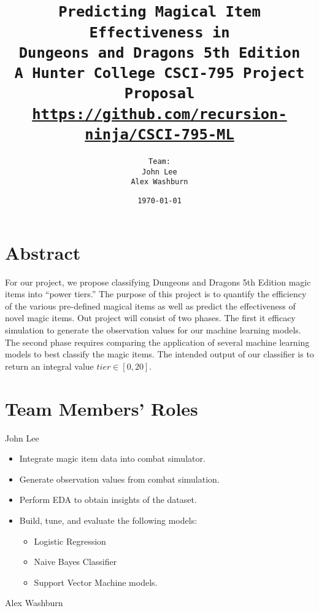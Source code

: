 \documentclass[12pt]{diazessay}
\title{\texttt{\LARGE{Predicting Magical Item Effectiveness in \\Dungeons and Dragons 5th Edition} \\\vspace{-0.35cm} {\large A Hunter College CSCI-795 Project Proposal}\\\normalsize\url{https://github.com/recursion-ninja/CSCI-795-ML}}} %
\author{\texttt{{\Huge Team:}\\\vspace*{-0.5em} 
		John Lee \\\vspace*{-0.5em} 
		Alex Washburn}} %
\date{\texttt{\today}} %
\begin{document}
\maketitle %

\vspace{-1cm}
\section*{Abstract}


For our project, we propose classifying Dungeons and Dragons 5th Edition magic items into ``power tiers.''
The purpose of this project is to quantify the efficiency of the various pre-defined magical items as well as predict the effectiveness of novel magic items.
Out project will consist of two phases. The first it efficacy simulation to generate the observation values for our machine learning models.
The second phase requires comparing the application of several machine learning models to best classify the magic items.
The intended output of our classifier is to return an integral value $tier \in [0, 20]$.

\section*{Team Members' Roles}

John Lee

\begin{itemize}
	
	\item Integrate magic item data into combat simulator.
	\item Generate observation values from combat simulation.
	\item Perform EDA to obtain insights of the dataset.
	\item Build, tune, and evaluate the following models:
	\begin{itemize}
		\item Logistic Regression
		\item Naive Bayes Classifier
		\item Support Vector Machine models.
	\end{itemize}
	
\end{itemize}

Alex Washburn
\end{document}

